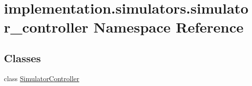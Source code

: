 \hypertarget{namespaceimplementation_1_1simulators_1_1simulator__controller}{}\section{implementation.\+simulators.\+simulator\+\_\+controller Namespace Reference}
\label{namespaceimplementation_1_1simulators_1_1simulator__controller}
\subsection*{Classes}
\begin{DoxyCompactItemize}
\item 
class \hyperlink{classimplementation_1_1simulators_1_1simulator__controller_1_1_simulator_controller}{Simulator\+Controller}
\end{DoxyCompactItemize}
